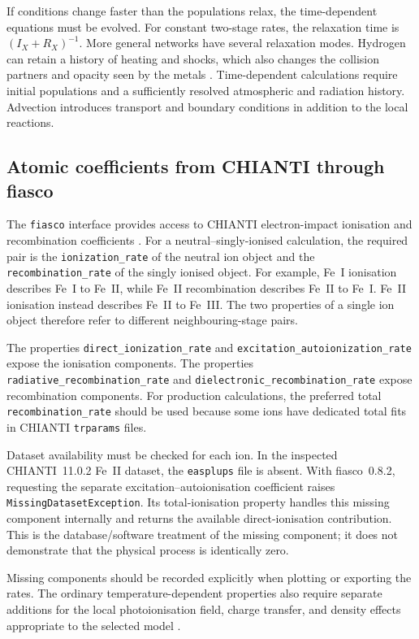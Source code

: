 If conditions change faster than the populations relax, the time-dependent
equations must be evolved. For constant two-stage rates, the relaxation time
is $(I_X+R_X)^{-1}$. More general networks have several relaxation modes.
Hydrogen can retain a history of heating and shocks, which also changes
the collision partners and opacity seen by the metals \citep{Carlsson2002}.
Time-dependent calculations require initial populations and a sufficiently
resolved atmospheric and radiation history. Advection introduces transport
and boundary conditions in addition to the local reactions.

\subsection{Atomic coefficients from CHIANTI through fiasco}

The \texttt{fiasco} interface provides access to CHIANTI electron-impact
ionisation and recombination coefficients \citep{FiascoDocumentation}.
For a neutral--singly-ionised calculation, the required pair is the
\texttt{ionization\_rate} of the neutral ion object and the
\texttt{recombination\_rate} of the singly ionised object.
For example, Fe~I ionisation describes Fe~I to Fe~II, while Fe~II recombination
describes Fe~II to Fe~I. Fe~II ionisation instead describes Fe~II to Fe~III.
The two properties of a single ion object therefore refer to different
neighbouring-stage pairs.

The properties \texttt{direct\_ionization\_rate} and
\texttt{excitation\_autoionization\_rate} expose the ionisation components.
The properties \texttt{radiative\_recombination\_rate} and
\texttt{dielectronic\_recombination\_rate} expose recombination components.
For production calculations, the preferred total
\texttt{recombination\_rate} should be used because some ions have dedicated
total fits in CHIANTI \texttt{trparams} files.

Dataset availability must be checked for each ion. In the inspected
CHIANTI~11.0.2 Fe~II dataset, the \texttt{easplups} file is absent.
With fiasco~0.8.2, requesting the separate excitation--autoionisation
coefficient raises \texttt{MissingDatasetException}. Its total-ionisation
property handles this missing component internally and returns the
available direct-ionisation contribution. This is the database/software
treatment of the missing component; it does not demonstrate that the
physical process is identically zero.

Missing components should be recorded explicitly when plotting or exporting
the rates. The ordinary temperature-dependent properties also require
separate additions for the local photoionisation field, charge transfer,
and density effects appropriate to the selected model
\citep{Dufresne2024,Dufresne2025}.

